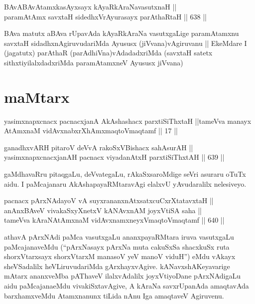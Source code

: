 
\begin{shl}
BAvABAvAtamxkasAyxsayx kAyaRkAraNavasutxnaH || \\
paramAtAmx savxtaH sidedhxVrAyurasayx parAthaRtaH \hfill || 638 ||  
\end{shl}

\begin{artha}
BAva matutx aBAva rUpavAda kAyaRkAraNa vasutxgaLige paramAtamxnu
savxtaH sidadhxnAgiruvudariMda Ayususx (jiVvana)vAgiruvanu || EkeMdare
I (jagatutx) parAthaR (parAdhiVna)vAdadadxriMda (savxtaH satetx
sithxtiyilalxdadxriMda paramAtamxneV Ayususx jiVvana) 
\end{artha}

\section*{maMtarx}

\begin{shl}
yasimxnapxcnacx pacnacxjanA AkAshashacx parxtiSiThxtaH ||tameVva manayx AtAmxnaM vidAvxnabxrXhAmxmaqtoV\s maqtamf || 17 ||
\end{shl}


\begin{shl}
ganadhxvARH pitaroV deVvA rakoSxVBishacx sahAsurAH || \\
yasimxnapxcnacxjanAH pacnacx viyadanAtxH parxtiSiThxtAH \hfill || 639 ||  
\end{shl}

\begin{artha}
gaMdhavaRru pitaqgaLu, deVvategaLu, rAkaSxsaroMdige seVri asuraru
oTuTx aidu. I paMcajanaru AkAshapayaRMtaravAgi elalxvU yAvudaralilx
nelesiveyo.
\end{artha}

\begin{shl}
pacnacx pArxNAdayoV vA suyxrananxnAtxsatxcuCxrXtatavxtaH || \\
anAnxBAveV vivakaSxyXnetxV kANAvxnAM joyxVtiSA saha || \\
tameVva kAraNAtAmxnaM vidAvxnamxneyxV\s maqtoV\s maqtamf \hfill || 640 ||  
\end{shl}

\begin{artha}
athavA pArxNAdi paMca vasutxgaLu ananxpayaRMtara iruva vasutxgaLu
paMcajanaveMdu (``pArxNasayx pArxNa muta cakuSxSa shacxkuSx ruta shorxVtarxsayx shorxVtarxM manasoV yeV manoV viduH'') eMdu vAkayx sheVSadalilx heVLiruvudariMda
gArxhayxvAgive. kANavxshAKeyavarige mAtarx ananxveMba pAThaveV
ilalxvAdalilx joyxVtiyoDane pArxNAdigaLu aidu paMcajanaeMdu
vivakiSxtavAgive, A kAraNa savxrUpanAda amaqtavAda barxhamxveMdu
Atamxnanunx tiLida nAnu Iga amaqtaveV Agiruvenu.
\end{artha}

